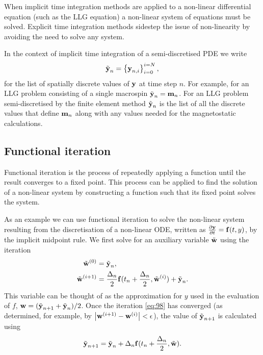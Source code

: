 When implicit time integration methods are applied to a non-linear differential equation (such as the LLG equation) a non-linear system of equations must be solved.
Explicit time integration methods sidestep the issue of non-linearity by avoiding the need to solve any system.

In the context of implicit time integration of a semi-discretised PDE we write
\begin{equation}
  \tilde{\boldsymbol{\mathrm{y}}}_n = \left\{ {\boldsymbol{\mathrm{y}}_{n,i}} \right\}_{i=0}^{i=N},
\end{equation}
for the list of spatially discrete values of $\boldsymbol{\mathrm{y}}$ at time step $n$.
For example, for an LLG problem consisting of a single macrospin $\tilde{\boldsymbol{\mathrm{y}}}_n = \boldsymbol{\mathrm{m}}_n$.
For an LLG problem semi-discretised by the finite element method $\tilde{\boldsymbol{\mathrm{y}}}_n$ is the list of all the discrete values that define $\boldsymbol{\mathrm{m}}_n$ along with any values needed for the magnetostatic calculations.


\subsection{Functional iteration}
\label{sec:picard}

Functional iteration is the process of repeatedly applying a function until the result converges to a fixed point.
This process can be applied to find the solution of a non-linear system by constructing a function such that its fixed point solves the system.

As an example we can use functional iteration to solve the non-linear system resulting from the discretisation of a non-linear ODE, written as $\frac{\partial \boldsymbol{\mathrm{y}}}{\partial t} = {\boldsymbol{\mathrm{f}}}(t,y)$, by the implicit midpoint rule.
We first solve for an auxiliary variable $\tilde{\boldsymbol{\mathrm{w}}}$ using the iteration
\begin{equation}
  \begin{aligned}
    {\tilde{\boldsymbol{\mathrm{w}}}}^{(0)} &= \tilde{\boldsymbol{\mathrm{y}}}_n, \\
    {\tilde{\boldsymbol{\mathrm{w}}}}^{(i+1)} &= \frac{\Delta_{n}}{2} {\boldsymbol{\mathrm{f}}}(t_n + \frac{\Delta_{n}}{2}, {\tilde{\boldsymbol{\mathrm{w}}}}^{(i)}) + \tilde{\boldsymbol{\mathrm{y}}}_n.
    \label{eq:98}
  \end{aligned}
\end{equation}
This variable can be thought of as the approximation for $y$ used in the evaluation of $f$, \ie $\boldsymbol{\mathrm{w}} = (\tilde{\boldsymbol{\mathrm{y}}}_{n+1} + \tilde{\boldsymbol{\mathrm{y}}}_n)/2$.
Once the iteration \cref{eq:98} has converged (as determined, for example, by $\left|{{\boldsymbol{\mathrm{w}}}^{(i+1)} - {\boldsymbol{\mathrm{w}}}^{(i)}} \right| < \epsilon$), the value of $\tilde{\boldsymbol{\mathrm{y}}}_{n+1}$ is calculated using
\begin{equation}
  \tilde{\boldsymbol{\mathrm{y}}}_{n+1} = \tilde{\boldsymbol{\mathrm{y}}}_n + \Delta_{n} {\boldsymbol{\mathrm{f}}}(t_n + \frac{\Delta_{n}}{2}, \tilde{\boldsymbol{\mathrm{w}}}).
\end{equation}

